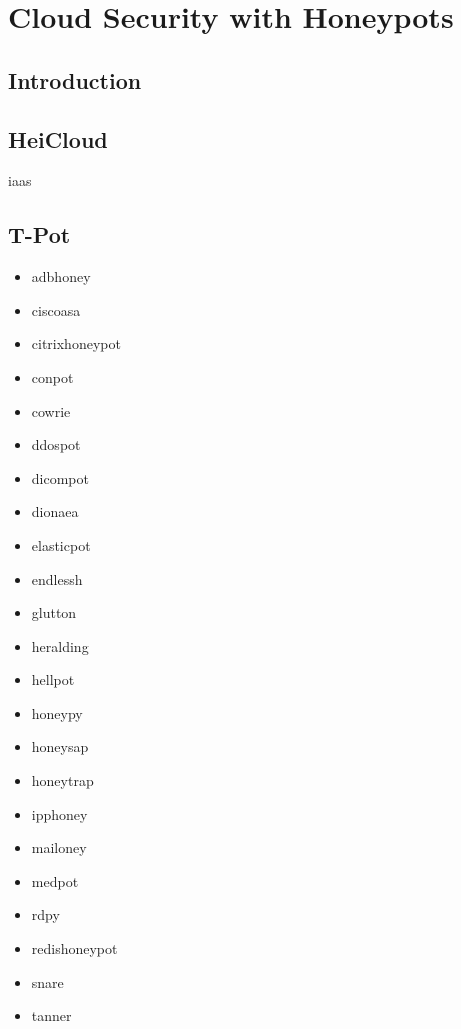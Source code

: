 \chapter{Cloud Security with Honeypots}

\section{Introduction}


\section{HeiCloud}

\ac{iaas}

\cite{heicloud2021}

\citet{Nithin2012}

\citet{Kelly2021}

\section{T-Pot}


\begin{itemize}
    \item adbhoney
    \item ciscoasa
    \item citrixhoneypot
    \item conpot
    \item cowrie
    \item ddospot
    \item dicompot
    \item dionaea
    \item elasticpot
    \item endlessh
    \item glutton
    \item heralding
    \item hellpot
    \item honeypy
    \item honeysap
    \item honeytrap
    \item ipphoney
    \item mailoney
    \item medpot
    \item rdpy
    \item redishoneypot
    \item snare
    \item tanner
\end{itemize}

